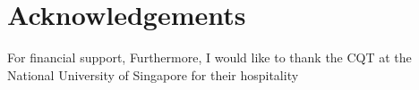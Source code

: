 
\chapter*{Acknowledgements} 


For financial support, 
Furthermore, I would like to thank the CQT at the National University of Singapore for their hospitality

